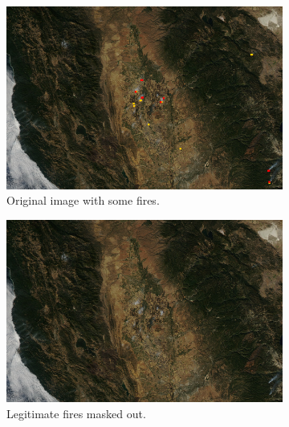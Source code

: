\begin{figure}
    \centering
    \begin{subfigure}{0.49\textwidth}
        \centering
        \includegraphics[width=\textwidth]{diagrams/injection/original.jpg}
        \caption{Original image with some fires.}
        \label{fig:injection-orig}
    \end{subfigure}
    \begin{subfigure}{0.49\textwidth}
        \centering
        \includegraphics[width=\textwidth]{diagrams/injection/masked_0.jpg}
        \caption{Legitimate fires masked out.}
        \label{fig:injection-masked}
    \end{subfigure}
    \begin{subfigure}{0.49\textwidth}
        \centering

\end{subfigure}
\end{figure}
